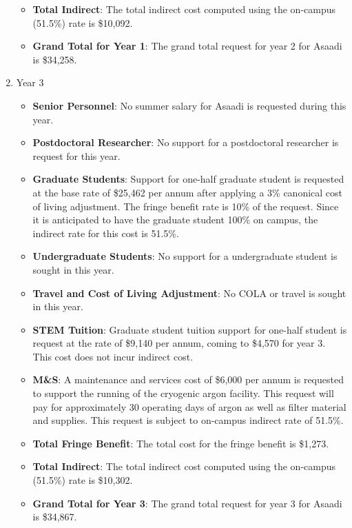 \begin{enumerate}
\begin{itemize}[noitemsep,nolistsep]
\item {{\bf Total Indirect}: The total indirect cost computed using the on-campus (51.5\%) rate is \$10,092.}

\item {{\bf Grand Total for Year 1}: The grand total request for year 2 for Asaadi is \$34,258.}

\end{itemize}

\item{Year 3}
\begin{itemize}[noitemsep,nolistsep]
\item{{\bf Senior Personnel}: No summer salary for Asaadi is requested during this year.}

\item {{\bf Postdoctoral Researcher}:  No support for a postdoctoral researcher is request for this year.} 

\item{{\bf Graduate Students}: Support for one-half graduate student is requested at the base rate of \$25,462 per annum after applying a 3\% canonical cost of living adjustment.   The fringe benefit rate is 10\% of the request.  Since it is anticipated to have the graduate student 100\% on campus, the indirect rate for this cost is 51.5\%.}

\item {{\bf Undergraduate Students}: No support for a undergraduate student is sought in this year.}

\item{{\bf Travel and Cost of Living Adjustment}: No COLA or travel is sought in this year.}

\item {{\bf STEM Tuition}: Graduate student tuition support for one-half student is request at the rate of \$9,140 per annum, coming to \$4,570 for year 3.  This cost does not incur indirect cost.}

\item {{\bf M\&S}: A maintenance and services cost of \$6,000 per annum is requested to support the running of the cryogenic argon facility. This request will pay for approximately 30 operating days of argon as well as filter material and supplies.    This request is subject to on-campus indirect rate of 51.5\%.}

\item {{\bf Total Fringe Benefit}: The total cost for the fringe benefit is \$1,273.}
\item {{\bf Total Indirect}: The total indirect cost computed using the on-campus (51.5\%) rate is \$10,302.}
\item {{\bf Grand Total for Year 3}: The grand total request for year 3 for Asaadi is \$34,867.}

\end{itemize}
\end{enumerate}

